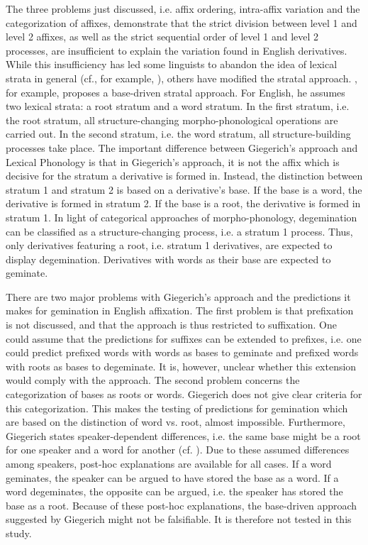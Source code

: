 The three problems just discussed, i.e. affix ordering, intra-affix variation and the categorization of affixes, demonstrate that the strict division between level 1 and level 2 affixes, as well as the strict sequential order of level 1 and level 2 processes, are insufficient to explain the variation found in English derivatives. While this insufficiency has led some linguists to  abandon the idea of lexical strata in general (cf., for example, \citealt{Johnson.1997b,Bybee.2001,Pierrehumbert.2001,Hay.2001}), others have modified the stratal approach. 
\cite{Giegerich.1999}, for example, proposes a base-driven stratal approach. For English, he assumes two lexical strata: a root stratum and a word stratum. In the first stratum, i.e. the root stratum, all structure-changing morpho-phonological operations are carried out. In the second stratum, i.e. the word stratum, all structure-building processes take place. The important difference between Giegerich's approach and Lexical Phonology is that in Giegerich's approach, it is not the affix which is decisive for the stratum a derivative is formed in. Instead, the distinction between stratum 1 and stratum 2 is based on a derivative's base. If the base is a word, the derivative is formed in stratum 2. If the base is a root, the derivative is formed in stratum 1. In light of categorical approaches of morpho-phonology, degemination can be classified as a structure-changing process, i.e. a stratum 1 process. Thus, only derivatives featuring a root, i.e. stratum 1 derivatives, are expected to display degemination. Derivatives with words as their base are expected to geminate.

There are two major problems with Giegerich's approach  and the predictions it makes for gemination in English affixation. The first problem is that prefixation is not discussed, and that the approach is thus restricted to suffixation. One could assume that the predictions for suffixes can be extended to prefixes, i.e. one could predict prefixed words with words as bases to geminate and prefixed words with roots as bases to degeminate. It is, however, unclear whether this extension would comply with the approach. %
The second problem concerns the categorization of bases as roots or words. Giegerich does not give clear criteria for this categorization. This makes the testing of predictions for gemination which are based on the distinction of word vs. root, almost impossible. 
Furthermore, Giegerich states speaker-dependent differences, i.e. the same base might be a root for one speaker and a word for another (cf. \citealt[chapter 3.2.1.]{Giegerich.1999}). 
Due to these assumed differences among speakers, post-hoc explanations are available for all cases. If a word geminates, the speaker can be argued to have stored the base as a word. If a word degeminates, the opposite can be argued, i.e. the speaker has stored the base as a root. Because of these post-hoc explanations, the base-driven approach suggested by Giegerich might not be falsifiable. It is therefore not tested in this study.

